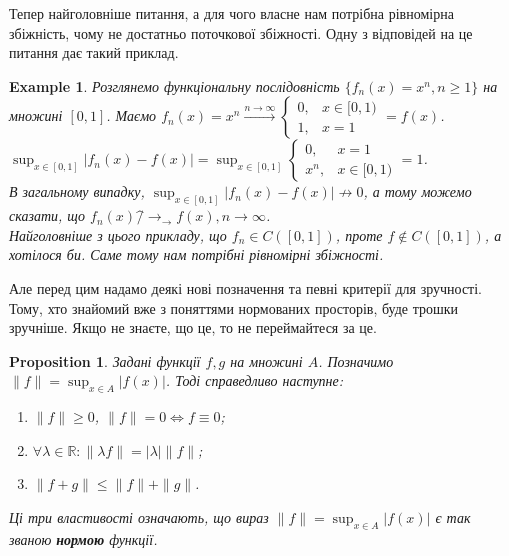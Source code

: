 \documentclass[a4paper, 10pt]{article}
\def\huge{\displaystyle}
\theoremstyle{theoremdd}
\theoremstyle{theoremdd}
\theoremstyle{theoremdd}
\theoremstyle{theoremdd}
\theoremstyle{theoremdd}
\newtheorem{example}[theorem]{Example}
\theoremstyle{theoremdd}
\newtheorem{proposition}[theorem]{Proposition}
\theoremstyle{theoremdd}
\theoremstyle{theoremdd}
\theoremstyle{theoremdd}
\begin{document}
Тепер найголовніше питання, а для чого власне нам потрібна рівномірна збіжність, чому не достатньо поточкової збіжності. Одну з відповідей на це питання дає такий приклад.

\begin{example}
Розглянемо функціональну послідовність $\{f_n(x) = x^n, n \geq 1\}$ на множині $[0,1]$. Маємо $f_n(x) = x^n \overset{n \to \infty}{\longrightarrow} \begin{cases} 0, & x \in [0,1) \\ 1, & x = 1 \end{cases} = f(x)$.\\
$\huge\sup_{x \in [0,1]} |f_n(x)-f(x)| = \sup_{x \in [0,1]}\begin{cases} 0, & x = 1 \\ x^n, & x \in [0,1) \end{cases} = 1$.\\
В загальному випадку, $\huge\sup_{x \in [0,1]} |f_n(x)-f(x)| \not\to 0$, а тому можемо сказати, що $f_n(x) \not^\rightarrow_\rightarrow f(x), n \to \infty$.\\
Найголовніше з цього прикладу, що $f_n \in C([0,1])$, проте $f \not\in C([0,1])$, а хотілося би. Саме тому нам потрібні рівномірні збіжності.
\end{example}

Але перед цим надамо деякі нові позначення та певні критерії для зручності. Тому, хто знайомий вже з поняттями нормованих просторів, буде трошки зручніше. Якщо не знаєте, що це, то не переймайтеся за це.

\begin{proposition}
Задані функції $f,g$ на множині $A$. Позначимо $\|f\| = \displaystyle\sup_{x \in A }|f(x)|$. Тоді справедливо наступне:
\begin{enumerate}[nosep,wide=0pt,label={\arabic*)}]
\item $\|f\| \geq 0$, \qquad $\|f\| = 0 \iff f \equiv 0$;
\item $\forall \lambda \in \mathbb{R}: \| \lambda f\| = |\lambda| \|f\|$;
\item $\|f+g\| \leq \|f\| + \|g\|$.
\end{enumerate}
Ці три властивості означають, що вираз $\|f\| = \displaystyle\sup_{x \in A} |f(x)|$ є так званою \textbf{нормою} функції.
\iffalse 5) $\abs{||f||-||g||} \leq ||f-g||$. \fi
\end{proposition}
\end{document}

